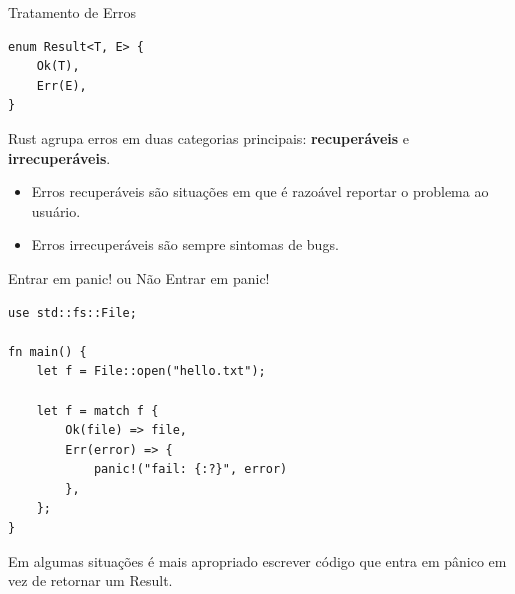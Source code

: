 \begin{frame}[fragile]{Tratamento de Erros}
\lstset{language=Rust, style=boxed}
\begin{lstlisting}
enum Result<T, E> {
    Ok(T),
    Err(E),
}
\end{lstlisting}
\small{Rust agrupa erros em duas categorias principais: \textbf{recuperáveis} e \textbf{irrecuperáveis}.}

\begin{itemize}
\item Erros recuperáveis são situações em que é razoável reportar o problema ao usuário.
\item Erros irrecuperáveis são sempre sintomas de bugs.
\end{itemize}

\end{frame}

\begin{frame}[fragile]{Entrar em panic! ou Não Entrar em panic!}
\lstset{language=Rust, style=boxed}
\begin{lstlisting}
use std::fs::File;

fn main() {
    let f = File::open("hello.txt");

    let f = match f {
        Ok(file) => file,
        Err(error) => {
            panic!("fail: {:?}", error)
        },
    };
}
\end{lstlisting}
\small{Em algumas situações é mais apropriado escrever código que entra em pânico em vez de retornar um Result.}

\end{frame}
